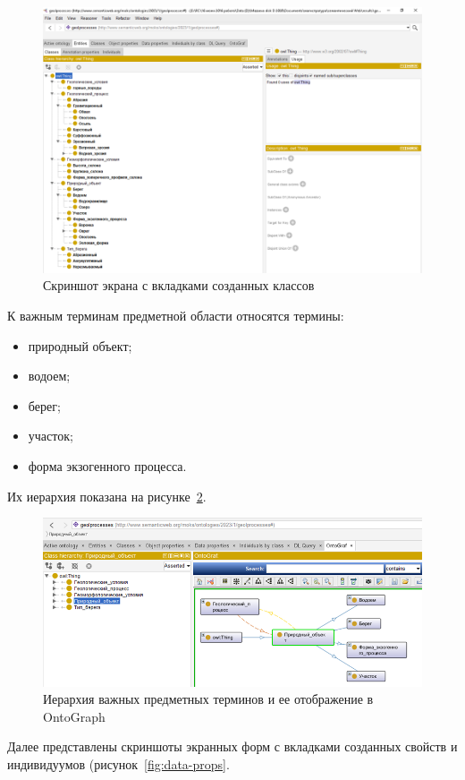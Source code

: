 \documentclass[732,14pt,final]{studrep}
\begin{document}
  \begin{figure}[htp]
	\centering
	\includegraphics[width=0.9\linewidth]{pics/image16.png}
    \caption{Скриншот экрана с вкладками созданных классов}
    \label{fig:onto-classes}
  \end{figure}

К важным терминам предметной области относятся термины:
\begin{itemize}
\item природный объект;
\item водоем;
\item берег;
\item участок;
\item форма экзогенного процесса.
\end{itemize}
Их иерархия показана на рисунке~\ref{fig:onto-hierarchy}.

  \begin{figure}[htp]
	\centering
	\includegraphics[width=0.9\linewidth]{pics/image2.png}
    \caption{Иерархия важных предметных терминов и ее отображение в OntoGraph}
    \label{fig:onto-hierarchy}
  \end{figure}

Далее представлены скриншоты экранных форм с вкладками созданных свойств и индивидуумов (рисунок~\ref{fig:data-props}.
\end{document}
